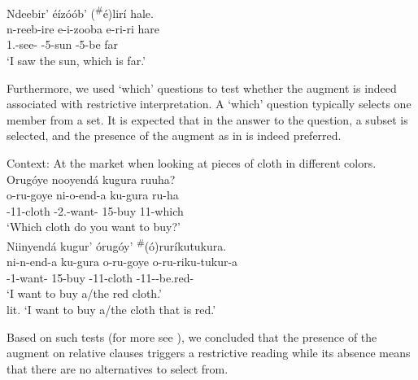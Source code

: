 \documentclass[output=paper]{langscibook}
\begin{document}
\ea
\label{bkm:Ref111493905}
\citep[1289]{AsiimweEtAl2023}\\
Ndeebir’ éízóób’ (\textsuperscript{\#}é)lirí hale.\\
\gll
n-reeb-ire  e-i-zooba  e-ri-ri  hare\\
1\SG{}.\SM{}-{}see-\PFV{}  \AUG{}-{}5-sun  \AUG{}-{}5\RM{}-be  far\\
\glt
‘I saw the sun, which is far.’\\


\z



Furthermore, we used ‘which’ questions to test whether the augment is indeed associated with restrictive interpretation. A ‘which’ question typically selects one member from a set. It is expected that in the answer to the question, a subset is selected, and the presence of the augment as in  is indeed preferred. 
\largerpage[-1]
\pagebreak

\ea
\label{bkm:Ref111493926}\citep[1290]{AsiimweEtAl2023}
\ea
\label{bkm:Ref111493926:a}
Context: At the market when looking at pieces of cloth in different colors. \\
Orugóye nooyendá kugura ruuha?\\
\gll
o-ru-goye  ni-o-end-a  ku-gura  ru-ha\\
\AUG{}-11-cloth  \IPFV{}-2\SG{}.\SM{}-want-\FV{}  15-buy  11-which\\
\glt
‘Which cloth do you want to buy?’\\


\ex
\label{bkm:Ref111493926:b}
Niinyendá kugur’ órugóy’ \textsuperscript{\#}(ó)ruríkutukura. \\
\gll
ni-n-end-a  ku-gura  o-ru-goye  o-ru-riku-tukur-a\\
\IPFV{}-{}1\SG{}-want-\FV{}  15-buy  \AUG{}-11-cloth  \AUG{}-11\RM{}-\IPFV{}-be.red-\FV{}\\
\glt
`I want to buy a/the red cloth.’\\
lit. ‘I want to buy a/the cloth that is red.’


\z
\z

Based on such tests (for more see \citealt{AsiimweEtAl2023}), we concluded that the presence of the augment on relative clauses triggers a restrictive reading while its absence means that there are no alternatives to select from.
\end{document}
